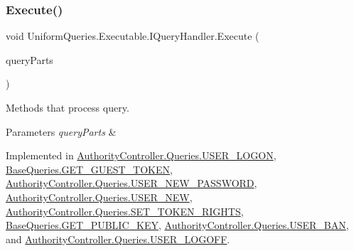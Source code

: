 \mbox{\label{interface_uniform_queries_1_1_executable_1_1_i_query_handler_a3268d72c0388f5e3debba4d73bdfe523}} 
\subsubsection{\texorpdfstring{Execute()}{Execute()}}
{\footnotesize\ttfamily void Uniform\+Queries.\+Executable.\+I\+Query\+Handler.\+Execute (\begin{DoxyParamCaption}\item[{\mbox{\hyperlink{struct_uniform_queries_1_1_query_part}{Query\+Part}} \mbox{[}$\,$\mbox{]}}]{query\+Parts }\end{DoxyParamCaption})}



Methods that process query. 


\begin{DoxyParams}{Parameters}
{\em query\+Parts} & \\
\hline
\end{DoxyParams}


Implemented in \mbox{\hyperlink{class_authority_controller_1_1_queries_1_1_u_s_e_r___l_o_g_o_n_a001f81c71597259636be777078e50f7e}{Authority\+Controller.\+Queries.\+U\+S\+E\+R\+\_\+\+L\+O\+G\+ON}}, \mbox{\hyperlink{class_base_queries_1_1_g_e_t___g_u_e_s_t___t_o_k_e_n_afbad0ace27a743793bccea51a5c39db5}{Base\+Queries.\+G\+E\+T\+\_\+\+G\+U\+E\+S\+T\+\_\+\+T\+O\+K\+EN}}, \mbox{\hyperlink{class_authority_controller_1_1_queries_1_1_u_s_e_r___n_e_w___p_a_s_s_w_o_r_d_a567cb1f67a718cab9dae99a9d4e892d4}{Authority\+Controller.\+Queries.\+U\+S\+E\+R\+\_\+\+N\+E\+W\+\_\+\+P\+A\+S\+S\+W\+O\+RD}}, \mbox{\hyperlink{class_authority_controller_1_1_queries_1_1_u_s_e_r___n_e_w_a05ffc1bd68a9d937aee817c05f273005}{Authority\+Controller.\+Queries.\+U\+S\+E\+R\+\_\+\+N\+EW}}, \mbox{\hyperlink{class_authority_controller_1_1_queries_1_1_s_e_t___t_o_k_e_n___r_i_g_h_t_s_aebb323c8033e3a027f59c55a95695360}{Authority\+Controller.\+Queries.\+S\+E\+T\+\_\+\+T\+O\+K\+E\+N\+\_\+\+R\+I\+G\+H\+TS}}, \mbox{\hyperlink{class_base_queries_1_1_g_e_t___p_u_b_l_i_c___k_e_y_a6351a2ced538508e861a1829864d1d0d}{Base\+Queries.\+G\+E\+T\+\_\+\+P\+U\+B\+L\+I\+C\+\_\+\+K\+EY}}, \mbox{\hyperlink{class_authority_controller_1_1_queries_1_1_u_s_e_r___b_a_n_a160a12bc99edf855a2bdddb908596ecf}{Authority\+Controller.\+Queries.\+U\+S\+E\+R\+\_\+\+B\+AN}}, and \mbox{\hyperlink{class_authority_controller_1_1_queries_1_1_u_s_e_r___l_o_g_o_f_f_a2e4d5a0f8ee93210522c41a38adbcce2}{Authority\+Controller.\+Queries.\+U\+S\+E\+R\+\_\+\+L\+O\+G\+O\+FF}}.

